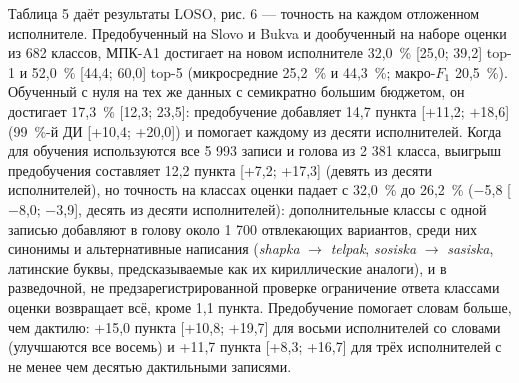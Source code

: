 \documentclass[a4paper,fleqn]{cas-dc}
\begin{document}
Таблица 5 даёт результаты LOSO, рис. 6 --- точность на каждом отложенном исполнителе. Предобученный на Slovo и Bukva и дообученный на наборе оценки из 682 классов, МПК-A1 достигает на новом исполнителе 32,0~\% {[}25,0; 39,2{]} top-1 и 52,0~\% {[}44,4; 60,0{]} top-5 (микросредние 25,2~\% и 44,3~\%; макро-\(F_1\) 20,5~\%). Обученный с нуля на тех же данных с семикратно большим бюджетом, он достигает 17,3~\% {[}12,3; 23,5{]}: предобучение добавляет 14,7 пункта {[}+11,2; +18,6{]} (99~\%-й ДИ {[}+10,4; +20,0{]}) и помогает каждому из десяти исполнителей. Когда для обучения используются все 5 993 записи и голова из 2 381 класса, выигрыш предобучения составляет 12,2 пункта {[}+7,2; +17,3{]} (девять из десяти исполнителей), но точность на классах оценки падает с 32,0~\% до 26,2~\% ($-$5,8 {[}$-$8,0; $-$3,9{]}, десять из десяти исполнителей): дополнительные классы с одной записью добавляют в голову около 1 700 отвлекающих вариантов, среди них синонимы и альтернативные написания (\emph{shapka} $\rightarrow$ \emph{telpak}, \emph{sosiska} $\rightarrow$ \emph{sasiska}, латинские буквы, предсказываемые как их кириллические аналоги), и в разведочной, не предзарегистрированной проверке ограничение ответа классами оценки возвращает всё, кроме 1,1 пункта. Предобучение помогает словам больше, чем дактилю: +15,0 пункта {[}+10,8; +19,7{]} для восьми исполнителей со словами (улучшаются все восемь) и +11,7 пункта {[}+8,3; +16,7{]} для трёх исполнителей с не менее чем десятью дактильными записями.
\end{document}
